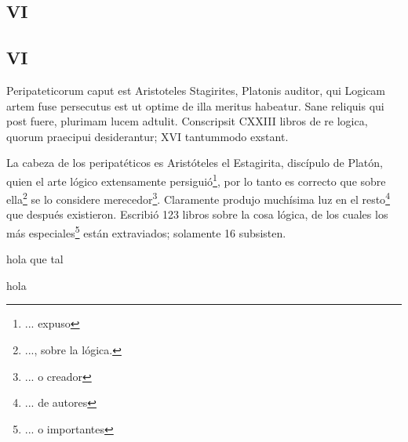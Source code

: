 \documentclass{article}
\begin{document}
\begin{paracol}{2}
  
  \subsection*{VI}

  \switchcolumn

  \subsection*{VI}

  \switchcolumn
  
  Peripateticorum caput est Aristoteles Stagirites, Platonis auditor, qui Logicam artem fuse persecutus est ut optime de illa meritus habeatur. Sane reliquis qui post fuere, plurimam lucem adtulit. Conscripsit CXXIII libros de re logica, quorum praecipui desiderantur; XVI tantummodo exstant.

  \switchcolumn

  La cabeza de los peripatéticos es Aristóteles el Estagirita, discípulo de Platón, quien el arte lógico extensamente persiguió\footnote{... expuso}, por lo tanto es correcto que sobre ella\footnote{..., sobre la lógica.} se lo considere merecedor\footnote{... o creador}. Claramente produjo muchísima luz en el resto\footnote{... de autores} que después existieron. Escribió 123 libros sobre la cosa lógica, de los cuales los más especiales\footnote{... o importantes} están extraviados; solamente 16 subsisten.

\end{paracol}

\vspace{0.5cm}

\begin{paracol}{2}

  hola que tal

  \switchcolumn

  hola

\end{paracol}
\end{document}
